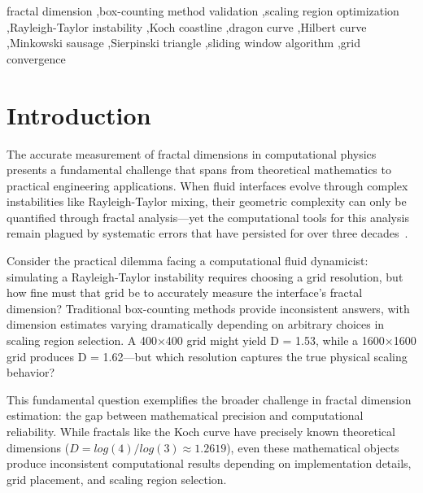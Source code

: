 \documentclass[preprint,12pt]{elsarticle}
\def\log{log}%
\begin{document}
\begin{frontmatter}
\begin{abstract}
\end{abstract}

\begin{keyword}
fractal dimension \sep box-counting method validation \sep scaling region optimization \sep Rayleigh-Taylor instability \sep Koch coastline \sep dragon curve \sep Hilbert curve \sep Minkowski sausage \sep Sierpinski triangle \sep sliding window algorithm \sep grid convergence
\end{keyword}

\end{frontmatter}


\section{Introduction}
\label{sec:introduction}

The accurate measurement of fractal dimensions in computational physics presents a fundamental challenge that spans from theoretical mathematics to practical engineering applications. When fluid interfaces evolve through complex instabilities like Rayleigh-Taylor mixing, their geometric complexity can only be quantified through fractal analysis—yet the computational tools for this analysis remain plagued by systematic errors that have persisted for over three decades~\cite{liebovitch1989,bouda2016}.

Consider the practical dilemma facing a computational fluid dynamicist: simulating a Rayleigh-Taylor instability requires choosing a grid resolution, but how fine must that grid be to accurately measure the interface's fractal dimension? Traditional box-counting methods provide inconsistent answers, with dimension estimates varying dramatically depending on arbitrary choices in scaling region selection. A 400×400 grid might yield D = 1.53, while a 1600×1600 grid produces D = 1.62—but which resolution captures the true physical scaling behavior?

This fundamental question exemplifies the broader challenge in fractal dimension estimation: the gap between mathematical precision and computational reliability. While fractals like the Koch curve have precisely known theoretical dimensions ($D = \log(4)/\log(3) \approx 1.2619$), even these mathematical objects produce inconsistent computational results depending on implementation details, grid placement, and scaling region selection.
\end{document}
